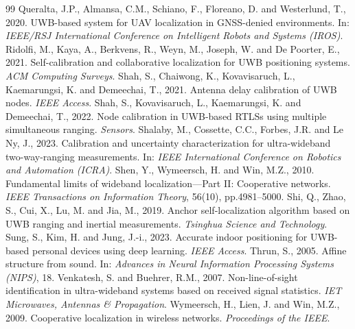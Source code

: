 \documentclass[11pt,a4paper]{article}
\begin{document}
\begin{thebibliography}{99}
 Queralta, J.P., Almansa, C.M., Schiano, F., Floreano, D. and Westerlund, T., 2020. UWB-based system for UAV localization in GNSS-denied environments. In: \emph{IEEE/RSJ International Conference on Intelligent Robots and Systems (IROS)}.
 Ridolfi, M., Kaya, A., Berkvens, R., Weyn, M., Joseph, W. and De Poorter, E., 2021. Self-calibration and collaborative localization for UWB positioning systems. \emph{ACM Computing Surveys}.
 Shah, S., Chaiwong, K., Kovavisaruch, L., Kaemarungsi, K. and Demeechai, T., 2021. Antenna delay calibration of UWB nodes. \emph{IEEE Access}.
 Shah, S., Kovavisaruch, L., Kaemarungsi, K. and Demeechai, T., 2022. Node calibration in UWB-based RTLSs using multiple simultaneous ranging. \emph{Sensors}.
 Shalaby, M., Cossette, C.C., Forbes, J.R. and Le Ny, J., 2023. Calibration and uncertainty characterization for ultra-wideband two-way-ranging measurements. In: \emph{IEEE International Conference on Robotics and Automation (ICRA)}.
 Shen, Y., Wymeersch, H. and Win, M.Z., 2010. Fundamental limits of wideband localization---Part II: Cooperative networks. \emph{IEEE Transactions on Information Theory}, 56(10), pp.4981--5000.
 Shi, Q., Zhao, S., Cui, X., Lu, M. and Jia, M., 2019. Anchor self-localization algorithm based on UWB ranging and inertial measurements. \emph{Tsinghua Science and Technology}.
 Sung, S., Kim, H. and Jung, J.-i., 2023. Accurate indoor positioning for UWB-based personal devices using deep learning. \emph{IEEE Access}.
 Thrun, S., 2005. Affine structure from sound. In: \emph{Advances in Neural Information Processing Systems (NIPS)}, 18.
 Venkatesh, S. and Buehrer, R.M., 2007. Non-line-of-sight identification in ultra-wideband systems based on received signal statistics. \emph{IET Microwaves, Antennas \& Propagation}.
 Wymeersch, H., Lien, J. and Win, M.Z., 2009. Cooperative localization in wireless networks. \emph{Proceedings of the IEEE}.

\end{thebibliography}
\end{document}
